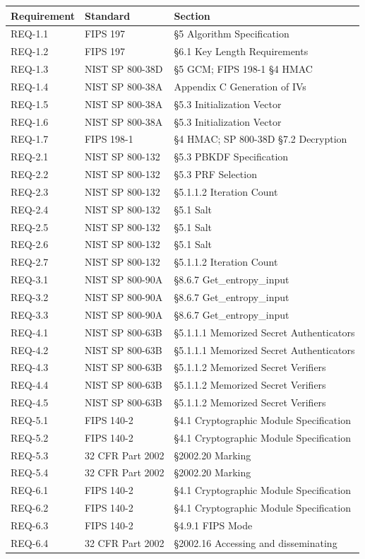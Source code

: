 \documentclass[11pt,letterpaper]{article}
\begin{document}
\begin{tabularx}{\textwidth}{llX}
\toprule
\textbf{Requirement} & \textbf{Standard} & \textbf{Section} \\
\midrule
REQ-1.1 & FIPS 197 & \S5 Algorithm Specification \\
REQ-1.2 & FIPS 197 & \S6.1 Key Length Requirements \\
REQ-1.3 & NIST SP 800-38D & \S5 GCM; FIPS 198-1 \S4 HMAC \\
REQ-1.4 & NIST SP 800-38A & Appendix C Generation of IVs \\
REQ-1.5 & NIST SP 800-38A & \S5.3 Initialization Vector \\
REQ-1.6 & NIST SP 800-38A & \S5.3 Initialization Vector \\
REQ-1.7 & FIPS 198-1 & \S4 HMAC; SP 800-38D \S7.2 Decryption \\
REQ-2.1 & NIST SP 800-132 & \S5.3 PBKDF Specification \\
REQ-2.2 & NIST SP 800-132 & \S5.3 PRF Selection \\
REQ-2.3 & NIST SP 800-132 & \S5.1.1.2 Iteration Count \\
REQ-2.4 & NIST SP 800-132 & \S5.1 Salt \\
REQ-2.5 & NIST SP 800-132 & \S5.1 Salt \\
REQ-2.6 & NIST SP 800-132 & \S5.1 Salt \\
REQ-2.7 & NIST SP 800-132 & \S5.1.1.2 Iteration Count \\
REQ-3.1 & NIST SP 800-90A & \S8.6.7 Get\_entropy\_input \\
REQ-3.2 & NIST SP 800-90A & \S8.6.7 Get\_entropy\_input \\
REQ-3.3 & NIST SP 800-90A & \S8.6.7 Get\_entropy\_input \\
REQ-4.1 & NIST SP 800-63B & \S5.1.1.1 Memorized Secret Authenticators \\
REQ-4.2 & NIST SP 800-63B & \S5.1.1.1 Memorized Secret Authenticators \\
REQ-4.3 & NIST SP 800-63B & \S5.1.1.2 Memorized Secret Verifiers \\
REQ-4.4 & NIST SP 800-63B & \S5.1.1.2 Memorized Secret Verifiers \\
REQ-4.5 & NIST SP 800-63B & \S5.1.1.2 Memorized Secret Verifiers \\
REQ-5.1 & FIPS 140-2 & \S4.1 Cryptographic Module Specification \\
REQ-5.2 & FIPS 140-2 & \S4.1 Cryptographic Module Specification \\
REQ-5.3 & 32 CFR Part 2002 & \S2002.20 Marking \\
REQ-5.4 & 32 CFR Part 2002 & \S2002.20 Marking \\
REQ-6.1 & FIPS 140-2 & \S4.1 Cryptographic Module Specification \\
REQ-6.2 & FIPS 140-2 & \S4.1 Cryptographic Module Specification \\
REQ-6.3 & FIPS 140-2 & \S4.9.1 FIPS Mode \\
REQ-6.4 & 32 CFR Part 2002 & \S2002.16 Accessing and disseminating \\
\bottomrule
\end{tabularx}
\end{document}
